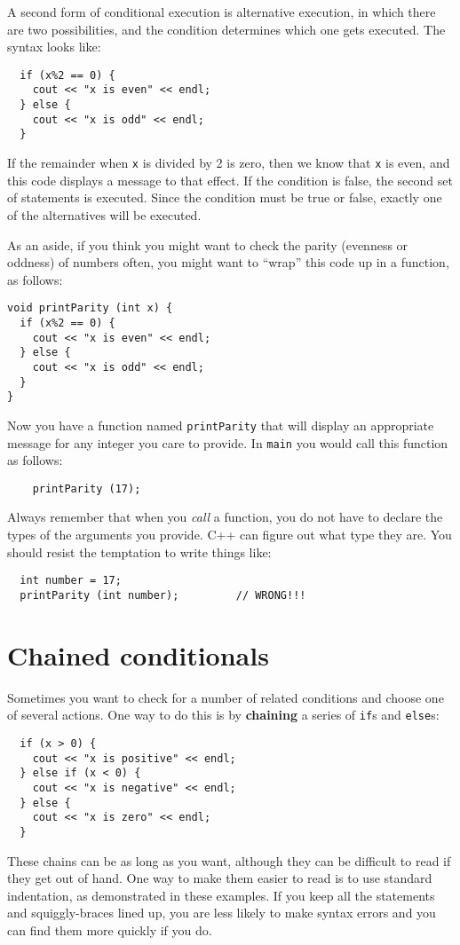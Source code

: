 A second form of conditional execution is alternative execution,
in which there are two possibilities, and the condition determines
which one gets executed.  The syntax looks like:

\begin{lstlisting}
  if (x%2 == 0) {
    cout << "x is even" << endl;
  } else {
    cout << "x is odd" << endl;
  }
\end{lstlisting}
%
If the remainder when {\tt x} is divided by 2 is zero, then
we know that {\tt x} is even, and this code displays a message
to that effect.  If the condition is false, the second
set of statements is executed.  Since the condition must
be true or false, exactly one of the alternatives will be
executed.

As an aside, if you think you might want to check the parity
(evenness or oddness) of numbers often, you might want to
``wrap'' this code up in a function, as follows:

\begin{lstlisting}
void printParity (int x) {
  if (x%2 == 0) {
    cout << "x is even" << endl;
  } else {
    cout << "x is odd" << endl;
  }
}
\end{lstlisting}
%
Now you have a function named {\tt printParity} that will display
an appropriate message for any integer you care to provide.
In {\tt main} you would call this function as follows:

\begin{lstlisting}
    printParity (17);
\end{lstlisting}
%
Always remember that when you {\em call} a function, you do
not have to declare the types of the arguments you provide.
C++ can figure out what type they are.  You should resist the
temptation to write things like:

\begin{lstlisting}
  int number = 17;
  printParity (int number);         // WRONG!!!
\end{lstlisting}

\section {Chained conditionals}

Sometimes you want to check for a number of related conditions
and choose one of several actions.  One way to do this is by
{\bf chaining} a series of {\tt if}s and {\tt else}s:

\begin{lstlisting}
  if (x > 0) {
    cout << "x is positive" << endl;
  } else if (x < 0) {
    cout << "x is negative" << endl;
  } else {
    cout << "x is zero" << endl;
  }
\end{lstlisting}
%
These chains can be as long as you want, although they can
be difficult to read if they get out of hand.  One way to
make them easier to read is to use standard indentation,
as demonstrated in these examples.  If you keep all the
statements and squiggly-braces lined up, you are less
likely to make syntax errors and you can find them more
quickly if you do.

